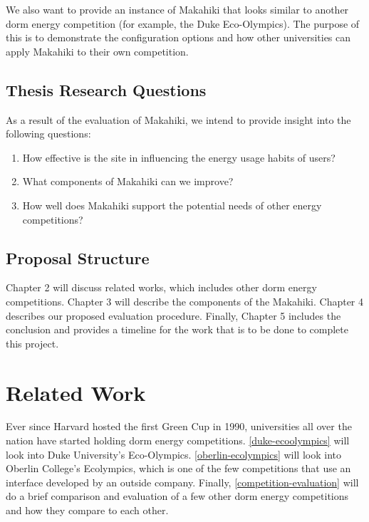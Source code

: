 We also want to provide an instance of Makahiki that looks similar to another dorm energy competition (for example, the Duke Eco-Olympics).  The purpose of this is to demonstrate the configuration options and how other universities can apply Makahiki to their own competition.


\section{Thesis Research Questions}

As a result of the evaluation of Makahiki, we intend to provide insight into the following questions:

\begin{enumerate}
	\item How effective is the site in influencing the energy usage habits of users?
	\item What components of Makahiki can we improve?
	\item How well does Makahiki support the potential needs of other energy competitions?
\end{enumerate}

\section{Proposal Structure}

Chapter 2 will discuss related works, which includes other dorm energy competitions.  Chapter 3 will describe the components of the Makahiki.  Chapter 4 describes our proposed evaluation procedure.  Finally, Chapter 5 includes the conclusion and provides a timeline for the work that is to be done to complete this project.

\chapter{Related Work}
\label{relatedwork}

Ever since Harvard hosted the first Green Cup in 1990\cite{harvard-greencup}, universities all over the nation have started holding dorm energy competitions. \autoref{duke-ecoolympics} will look into Duke University's Eco-Olympics.  \autoref{oberlin-ecolympics} will look into Oberlin College's Ecolympics, which is one of the few competitions that use an interface developed by an outside company. Finally, \autoref{competition-evaluation} will do a brief comparison and evaluation of a few other dorm energy competitions and how they compare to each other.

